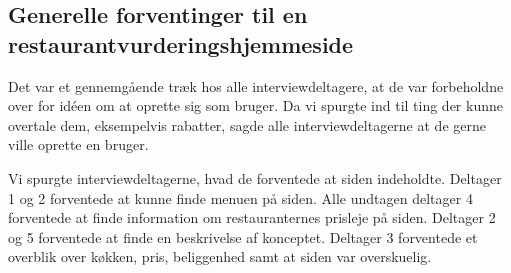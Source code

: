 \documentclass[a4paper, 12pt]{article}
\begin{document}


\subsection{Generelle forventinger til en restaurantvurderingshjemmeside}

Det var et gennemgående træk hos alle interviewdeltagere, at de var forbeholdne
over for idéen om at oprette sig som bruger. Da vi spurgte ind til ting der
kunne overtale dem, eksempelvis rabatter, sagde alle interviewdeltagerne at de
gerne ville oprette en bruger.

Vi spurgte interviewdeltagerne, hvad de forventede at siden indeholdte. Deltager 1
og 2 forventede at kunne finde menuen på siden. Alle undtagen deltager 4
forventede at finde information om restauranternes prisleje på siden. Deltager 2
og 5 forventede at finde en beskrivelse af konceptet. Deltager 3 forventede et
overblik over køkken, pris, beliggenhed samt at siden var overskuelig.


\end{document}
